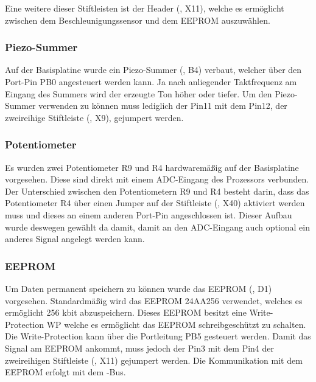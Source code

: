 Eine weitere dieser Stiftleisten ist der Header (, X11), welche es ermöglicht zwischen dem Beschleunigungssensor und dem EEPROM auszuwählen.


\subsubsection{Piezo-Summer}
Auf der \gls{Basisplatine} wurde ein Piezo-Summer (, B4) verbaut, welcher über den Port-Pin PB0 angesteuert werden kann. Ja nach anliegender Taktfrequenz am Eingang des Summers wird der erzeugte Ton höher oder tiefer. Um den Piezo-Summer verwenden zu können muss lediglich der Pin11 mit dem Pin12, der zweireihige Stiftleiste (, X9), gejumpert werden.


\subsubsection{Potentiometer}
Es wurden zwei Potentiometer R9 und R4 hardwaremäßig auf der \gls{Basisplatine} vorgesehen. Diese sind direkt mit einem ADC-Eingang des Prozessors verbunden. Der Unterschied zwischen den Potentiometern R9 und R4 besteht darin, dass das Potentiometer R4 über einen Jumper auf der Stiftleiste (, X40) aktiviert werden muss und dieses an einem anderen Port-Pin angeschlossen ist. Dieser Aufbau wurde deswegen gewählt da damit, damit an den ADC-Eingang auch optional ein anderes Signal angelegt werden kann. 


\subsubsection{EEPROM}
Um Daten permanent speichern zu können wurde das EEPROM (, D1) vorgesehen. Standardmäßig wird das EEPROM 24AA256 verwendet, welches es ermöglicht 256 kbit abzuspeichern. Dieses EEPROM besitzt eine Write-Protection WP welche es ermöglicht das EEPROM schreibgeschützt zu schalten. Die Write-Protection kann über die Portleitung PB5 gesteuert werden. Damit das Signal am EEPROM ankommt, muss jedoch der Pin3 mit dem Pin4 der zweireihigen Stiftleiste (, X11) gejumpert werden. Die Kommunikation mit dem EEPROM erfolgt mit dem \IIC{}-Bus.

